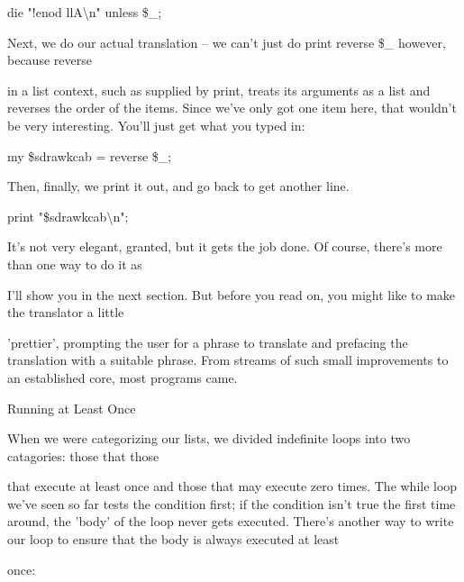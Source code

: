 \documentclass[a4paper,11pt]{book}
\begin{document}
\noindent 

\noindent die "!enod llA\textbackslash n" unless \$\_;

\noindent 

\noindent Next, we do our actual translation -- we can't just do print reverse \$\_ however, because reverse

\noindent in a list context, such as supplied by print, treats its arguments as a list and reverses the order of the items. Since we've only got one item here, that wouldn't be very interesting. You'll just get what you typed in:

\noindent 

\noindent my \$sdrawkcab = reverse \$\_;

\noindent 

\noindent Then, finally, we print it out, and go back to get another line.

\noindent 

\noindent 

\noindent print "\$sdrawkcab\textbackslash n";

\noindent 

\noindent It's not very elegant, granted, but it gets the job done. Of course, there's more than one way to do it as

\noindent I'll show you in the next section. But before you read on, you might like to make the translator a little

\noindent 'prettier', prompting the user for a phrase to translate and prefacing the translation with a suitable phrase. From streams of such small improvements to an established core, most programs came.

\noindent 

\noindent 

\noindent Running at Least Once

\noindent 

\noindent When we were categorizing our lists, we divided indefinite loops into two catagories: those that those

\noindent that execute at least once and those that may execute zero times. The while loop we've seen so far tests the condition first; if the condition isn't true the first time around, the 'body' of the loop never gets executed. There's another way to write our loop to ensure that the body is always executed at least

\noindent once:

\noindent 

\noindent 
\end{document}
